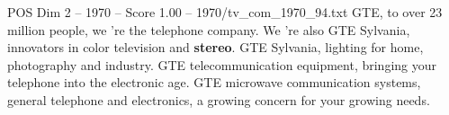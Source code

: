 \begin{textsample}{POS Dim 2 – 1970 – Score 1.00 – 1970/tv\_com\_1970\_94.txt}  \label{ex:f2_pos_057}
GTE, to over 23 million people, we 're the telephone company.
We 're also GTE Sylvania, innovators in color television and \textbf{stereo}.
GTE Sylvania, lighting for home, photography and industry.
GTE telecommunication equipment, bringing your telephone into the electronic age.
GTE microwave communication systems, general telephone and electronics, a growing concern for your growing needs.

\end{textsample}
